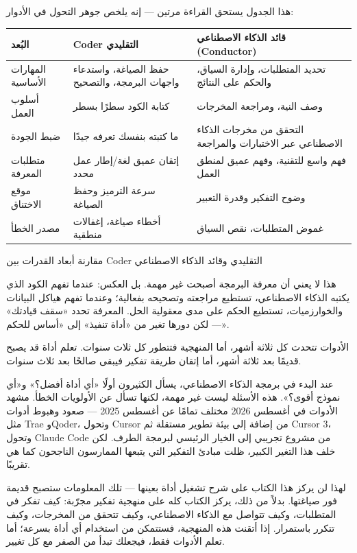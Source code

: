 هذا الجدول يستحق القراءة مرتين — إنه يلخص جوهر التحول في الأدوار:

\begin{center}
\begin{tabularx}{\linewidth}{|X|X|X|}
\hline
\textbf{البُعد} & \textbf{Coder التقليدي} & \textbf{قائد الذكاء الاصطناعي (Conductor)} \tabularnewline
\hline
المهارات الأساسية & حفظ الصياغة، واستدعاء واجهات البرمجة، والتصحيح & تحديد المتطلبات، وإدارة السياق، والحكم على النتائج \tabularnewline
أسلوب العمل & كتابة الكود سطرًا بسطر & وصف النية، ومراجعة المخرجات \tabularnewline
ضبط الجودة & ما كتبته بنفسك تعرفه جيدًا & التحقق من مخرجات الذكاء الاصطناعي عبر الاختبارات والمراجعة \tabularnewline
متطلبات المعرفة & إتقان عميق لغة/إطار عمل محدد & فهم واسع للتقنية، وفهم عميق لمنطق العمل \tabularnewline
موقع الاختناق & سرعة الترميز وحفظ الصياغة & وضوح التفكير وقدرة التعبير \tabularnewline
مصدر الخطأ & أخطاء صياغة، إغفالات منطقية & غموض المتطلبات، نقص السياق \tabularnewline
\hline
\end{tabularx}
\end{center}

\begin{center}\small\color{gray}مقارنة أبعاد القدرات بين Coder التقليدي وقائد الذكاء الاصطناعي\end{center}

هذا لا يعني أن معرفة البرمجة أصبحت غير مهمة. بل العكس: عندما تفهم الكود الذي يكتبه الذكاء الاصطناعي، تستطيع مراجعته وتصحيحه بفعالية؛ وعندما تفهم هياكل البيانات والخوارزميات، تستطيع الحكم على مدى معقولية الحل. المعرفة تحدد «سقف قيادتك» — لكن دورها تغير من «أداة تنفيذ» إلى «أساس للحكم».


الأدوات تتحدث كل ثلاثة أشهر، أما المنهجية فتتطور كل ثلاث سنوات. تعلم أداة قد يصبح قديمًا بعد ثلاثة أشهر، أما إتقان طريقة تفكير فيبقى صالحًا بعد ثلاث سنوات.

عند البدء في برمجة الذكاء الاصطناعي، يسأل الكثيرون أولًا «أي أداة أفضل؟» و«أي نموذج أقوى؟». هذه الأسئلة ليست غير مهمة، لكنها تسأل عن الأولويات الخطأ. مشهد الأدوات في أغسطس 2026 مختلف تمامًا عن أغسطس 2025 — صعود وهبوط أدوات مثل Trae وQoder، وتحول Cursor من إضافة إلى بيئة تطوير مستقلة ثم Cursor 3، وتحول Claude Code من مشروع تجريبي إلى الخيار الرئيسي لبرمجة الطرف. لكن خلف هذا التغير الكبير، ظلت مبادئ التفكير التي يتبعها الممارسون الناجحون كما هي تقريبًا.

لهذا لن يركز هذا الكتاب على شرح تشغيل أداة بعينها — تلك المعلومات ستصبح قديمة فور صياغتها. بدلاً من ذلك، يركز الكتاب كله على منهجية تفكير مجرّبة: كيف تفكر في المتطلبات، وكيف تتواصل مع الذكاء الاصطناعي، وكيف تتحقق من المخرجات، وكيف تتكرر باستمرار. إذا أتقنت هذه المنهجية، فستتمكن من استخدام أي أداة بسرعة؛ أما تعلم الأدوات فقط، فيجعلك تبدأ من الصفر مع كل تغيير.

